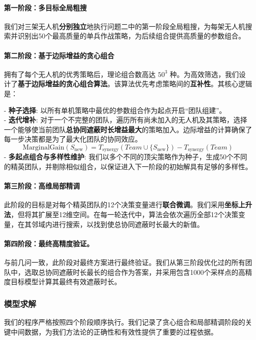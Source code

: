 \documentclass[12pt]{article}
\begin{document}
\begin{CJK}{UTF8}{gbsn}
	\paragraph{第一阶段：多目标全局粗搜}
	我们对三架无人机\textbf{分别独立}地执行问题二中的第一阶段全局粗搜，为每架无人机搜索并识别出50个最高质量的单兵作战策略，为后续组合提供高质量的参数组合。
	
	\paragraph{第二阶段：基于边际增益的贪心组合}
	拥有了每个无人机的优秀策略后，理论组合数高达 $50^3$ 种。为高效筛选，我们设计了\textbf{基于边际增益的贪心组合算法}。该算法优先考虑策略间的\textbf{互补性}。其核心逻辑是：
	
		 \indent - \textbf{种子选择}: 以所有单机策略中最优的参数组合作为起点开启“团队组建”。\\
		 \indent - \textbf{迭代增补}: 对于一个不完整的团队，遍历所有尚未加入的无人机及其策略，选择一个能够使当前团队\textbf{总协同遮蔽时长增益最大}的策略加入。边际增益的计算确保了每一步决策都是为了最大化团队的协同效应。\\
		\begin{equation}
			\text{MarginalGain}(S_{\text{new}}) = T_{\text{synergy}}(Team \cup \{S_{\text{new}}\}) - T_{\text{synergy}}(Team)
		\end{equation}
		 \indent - \textbf{多起点组合与多样性维护}: 我们以多个不同的顶尖策略作为种子，生成50个不同的精英团队，并剔除相似组合，以保证进入下一阶段的初始解具有足够的多样性。

	
	\paragraph{第三阶段：高维局部精调}
	此阶段的目标是对每个精英团队的12个决策变量进行\textbf{联合微调}。我们采用\textbf{坐标上升法}，但将其扩展至12维空间。在每一轮迭代中，算法会依次遍历全部12个决策变量，在其邻域内进行搜索，以找到使总协同遮蔽时长最大的新值。
	
	\paragraph{第四阶段：最终高精度验证。}
	与前几问一致，此阶段对最终方案进行最终验证。我们从第三阶段优化过的所有团队中，选取总协同遮蔽时长最长的组合作为答案，并采用包含1000个采样点的高精度目标模型计算其最终有效遮蔽时长。
	
	
	\subsubsection{模型求解}
	我们的程序严格按照四个阶段顺序执行。我们记录了贪心组合和局部精调阶段的关键中间数据，为我们方法论的正确性和有效性提供了重要的过程依据。
	

\end{CJK}
\end{document}
